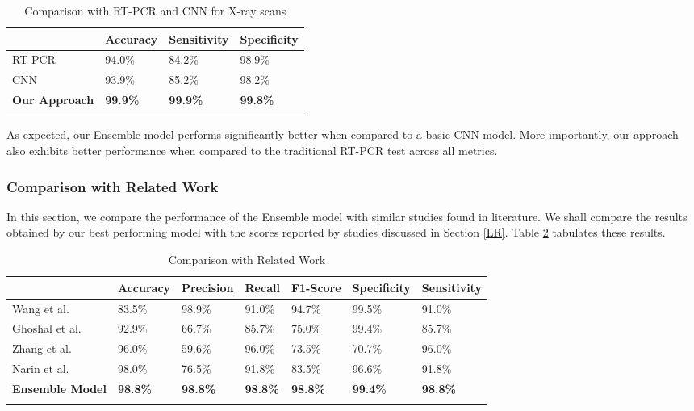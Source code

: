  \begin{longtable}{| p{} | p{} |  p{} |   p{} |} 
    \hline
& \textbf{Accuracy} & \textbf{Sensitivity} & \textbf{Specificity} \\
\hline

			RT-PCR      &94.0\%   &84.2\%    &98.9\%  
\\\hline
			CNN    &93.9\%   &85.2\%    &98.2\% 
\\\hline
			\textbf{Our Approach}   &\textbf{99.9\%}   &\textbf{99.9\%}    &\textbf{99.8\%} 
\\\hline
 \caption{Comparison with RT-PCR and CNN for X-ray scans}  \label{tab:comp}
    \end{longtable}
\vspace{-1em}
As expected, our Ensemble model performs significantly better when compared to a basic CNN model. More importantly, our approach also exhibits better performance when compared to the traditional RT-PCR test across all metrics.

\subsubsection{Comparison with Related Work}

In this section, we compare the performance of the Ensemble model with similar studies found in literature. We shall compare the results obtained by our best performing model with the scores reported by studies discussed in Section \ref{LR}. Table \ref{tab:relWorkXray} tabulates these results.

\vspace{1em}
 \begin{longtable}{| p{} |  p{} |   p{} | p{} | p{} | p{} | p{} |} 
    \hline
& \textbf{Accuracy} & \textbf{Precision} & \textbf{Recall} & \textbf{F1-Score} & \textbf{Specificity} & \textbf{Sensitivity} \\
\hline
Wang et al. \cite{LWA2020}   &83.5\%    &98.9\%     &91.0\%   &94.7\%    &99.5\%     &91.0\%
\\\hline

Ghoshal et al. \cite{GHT2020}   &92.9\%    &66.7\%     &85.7\%   &75.0\%    &99.4\%     &85.7\%
\\\hline
Zhang et al. \cite{ZXS+2020}   &96.0\%    &59.6\%     &96.0\%   &73.5\%    &70.7\%     &96.0\%
\\\hline
Narin et al. \cite{AKP2020}   &98.0\%    &76.5\%     &91.8\%   &83.5\%    &96.6\%     &91.8\%
\\\hline
    \textbf{Ensemble Model}    &\textbf{98.8\%}   &\textbf{98.8\%}    &\textbf{98.8\%}    &\textbf{98.8\%}   &\textbf{99.4\%}   &\textbf{98.8\%}  
\\\hline
 \caption{Comparison with Related Work}  \label{tab:relWorkXray}

    \end{longtable}
\vspace{-2em}

